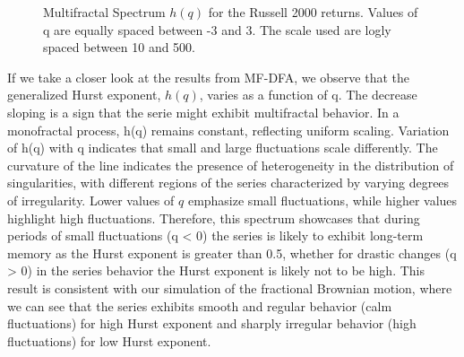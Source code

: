 \documentclass[11pt]{extarticle}
\begin{document}
\begin{figure}[htbp]
    \centering
    \caption{Multifractal Spectrum $h(q)$ for the Russell 2000 returns. Values of q are equally spaced between -3 and 3.
    The scale used are logly spaced between 10 and 500.}
\end{figure}

\FloatBarrier


If we take a closer look at the results from MF-DFA, we observe that the generalized Hurst exponent, $h(q)$,
varies as a function of q. The decrease sloping is a sign that the serie might exhibit multifractal behavior.
In a monofractal process, h(q) remains constant, reflecting uniform scaling.
Variation of h(q) with q indicates that small and large fluctuations scale differently.
The curvature of the line indicates the presence of heterogeneity in the distribution of singularities, with
different regions of the series characterized by varying degrees of irregularity.
Lower values of $q$ emphasize small fluctuations, while higher values highlight high fluctuations.
Therefore, this spectrum showcases that during periods of small fluctuations (q < 0) the series is likely to exhibit long-term
memory as the Hurst exponent is greater than 0.5, whether for drastic changes (q > 0) in the series behavior the Hurst exponent
is likely not to be high.
This result is consistent with our simulation of the fractional Brownian motion, where we can see that the
series exhibits smooth and regular behavior (calm fluctuations) for high Hurst exponent and sharply irregular behavior
(high fluctuations) for low Hurst exponent.
\end{document}
